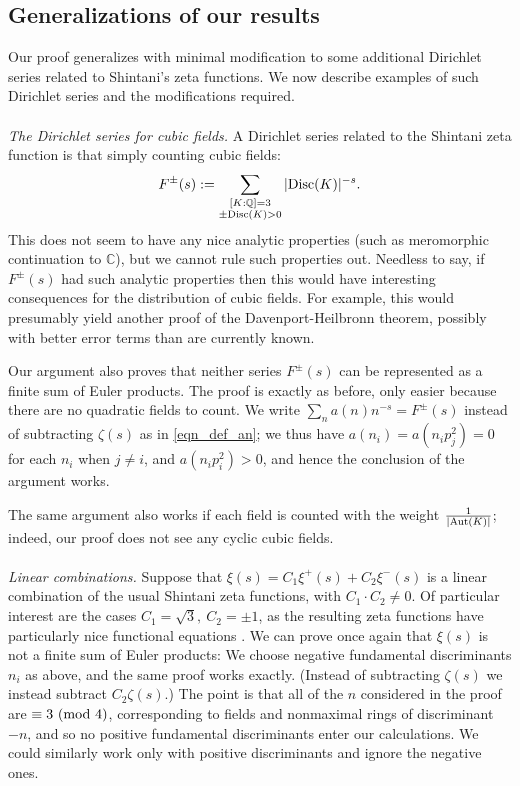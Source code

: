 \documentclass[12pt]{amsart}
\theoremstyle{remark}
\numberwithin{theorem}{section} \numberwithin{equation}{section}
\newcommand{\Aut}{{\text {\rm Aut}}}
\newcommand{\Q}{\mathbb{Q}}
\newcommand{\textmod}{{\text {\rm mod}}}
\newcommand{\Disc}{\textnormal{Disc}}
\begin{document}
\subsection{Generalizations of our results}
Our proof generalizes with minimal modification to some additional Dirichlet series related to Shintani's zeta functions. We now describe examples of such
Dirichlet series and the modifications required.
\\
\\
{\itshape The Dirichlet series for cubic fields.} A Dirichlet series related to the Shintani zeta function is that
simply counting cubic fields:
\begin{equation}
F^{\pm}(s) := \sum_{\substack{[K : \Q] = 3 \\ \pm \Disc(K) > 0}} |\Disc(K)|^{-s}.
\end{equation}
This does not seem to have any nice analytic properties (such as meromorphic continuation to $\mathbb{C}$),
but we cannot rule such properties out. Needless to say, if $F^{\pm}(s)$ had such analytic properties then
this would have interesting consequences for the distribution of cubic fields. For example, this would presumably
yield another proof of the Davenport-Heilbronn theorem, possibly with better error terms than are currently known.

Our argument also proves that neither series $F^{\pm}(s)$ can be represented as a finite sum of Euler
products. The proof is exactly as before, only easier because there are no quadratic fields to count.
We write
$\sum_n a(n) n^{-s} = F^{\pm}(s)$ instead of subtracting $\zeta(s)$ as in \eqref{eqn_def_an}; we thus
have $a(n_i) = a(n_i p_j^2) = 0$ for each $n_i$ when $j \neq i$, and $a(n _i p_i^2) > 0$, and hence the conclusion of the argument works.

The same argument also works if each field is counted with the weight $\frac{1}{|\Aut(K)|}$; indeed, our proof does not
see any cyclic cubic fields.
\\
\\
{\itshape Linear combinations.} Suppose that $\xi(s) = C_1 \xi^+(s) + C_2 \xi^-(s)$ is a linear combination of the usual
Shintani zeta functions, with $C_1 \cdot C_2 \neq 0$. Of particular interest are the cases $C_1 = \sqrt{3}, \ C_2 = \pm 1$,
as the resulting zeta functions have particularly nice functional equations \cite{DW2, N, O}.
We can prove once again that $\xi(s)$ is not a finite sum of Euler products:
We choose negative fundamental discriminants
$n_i$ as above, and the same proof works exactly. (Instead of subtracting $\zeta(s)$ we instead subtract
$C_2 \zeta(s)$.) The point is that all of the $n$ considered in the proof are $\equiv 3 \ (\textmod \ 4)$,
corresponding to fields and nonmaximal rings of discriminant $-n$, 
and so no positive fundamental discriminants enter our calculations. We could similarly work only with positive discriminants
and ignore the negative ones.
\end{document}
